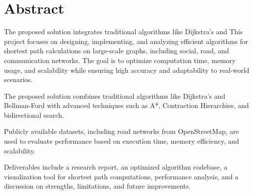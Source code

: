\vspace{2in}
\chapter*{Abstract}

The proposed solution integrates traditional algorithms like Dijkstra’s and 
This project focuses on designing, implementing, and analyzing efficient algorithms for shortest path calculations on large-scale graphs, including social, road, and communication networks. The goal is to optimize computation time, memory usage, and scalability while ensuring high accuracy and adaptability to real-world scenarios.

The proposed solution combines traditional algorithms like Dijkstra’s and Bellman-Ford with advanced techniques such as A*, Contraction Hierarchies, and bidirectional search.

Publicly available datasets, including road networks from OpenStreetMap, are used to evaluate performance based on execution time, memory efficiency, and scalability.

Deliverables include a research report, an optimized algorithm codebase, a visualization tool for shortest path computations, performance analysis, and a discussion on strengths, limitations, and future improvements.

